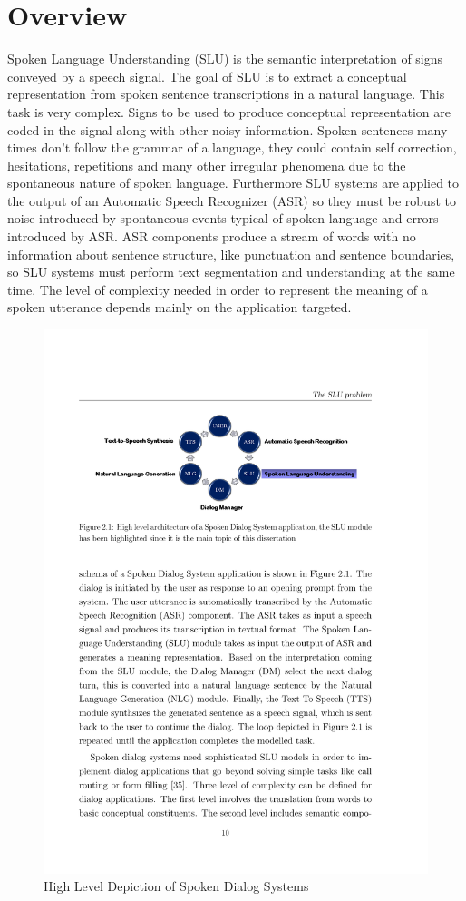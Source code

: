 \section{Overview}
Spoken Language Understanding (SLU) is the semantic interpretation of
signs conveyed by a speech signal. The goal of SLU is to extract a conceptual
representation from spoken sentence transcriptions in a natural
language. This task is very complex. Signs to be used to produce conceptual
representation are coded in the signal along with other noisy information.
Spoken sentences many times don’t follow the grammar of a
language, they could contain self correction, hesitations, repetitions and
many other irregular phenomena due to the spontaneous nature of spoken
language. Furthermore SLU systems are applied to the output of an Automatic
Speech Recognizer (ASR) so they must be robust to noise introduced
by spontaneous events typical of spoken language and errors introduced by
ASR. ASR components produce a stream of words with no information
about sentence structure, like punctuation and sentence boundaries, so
SLU systems must perform text segmentation and understanding at the
same time. The level of complexity needed in order to represent the meaning
of a spoken utterance depends mainly on the application targeted.
\par
\begin{figure}
	\centering
	\includegraphics[width=\textwidth]{intro-cyclefig}
	\caption{High Level Depiction of Spoken Dialog Systems}
\end{figure}

